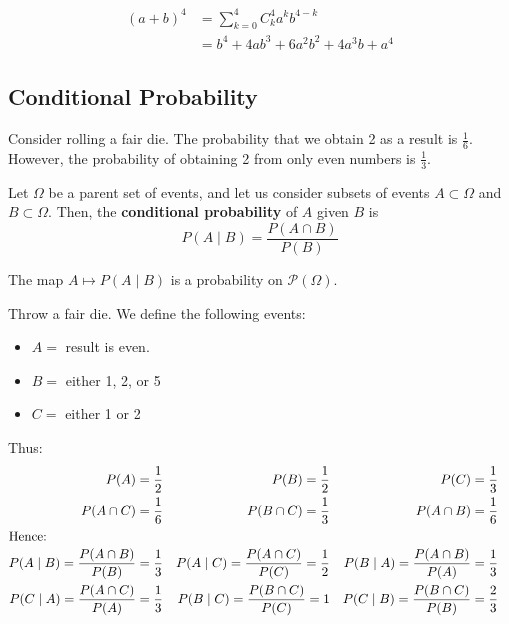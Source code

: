 \documentclass{article}
\begin{document}
	\begin{exmp}
		\begin{align*}
			(a+b)^4 &= \sum_{k=0}^4 C_k^4 a^k b^{4-k} \\
			&= b^4 + 4ab^3 + 6a^2 b^2 + 4a^3 b + a^4
		\end{align*}
	\end{exmp}
\hfill
\subsection{Conditional Probability}
	Consider rolling a fair die. The probability that we obtain 2 as a result is $\frac{1}{6}$. However, the probability of obtaining 2 from only even numbers is $\frac{1}{3}$.
	
	\begin{defn}
		Let $\Omega$ be a parent set of events, and let us consider subsets of events $A \subset \Omega$ and $B \subset \Omega$.  Then, the \textbf{conditional probability} of $A$ given $B$ is
		$$ P(A \mid B ) = \frac{P (A \cap B)}{P(B)}$$
	\end{defn}
	\begin{center}
	\end{center}
	\begin{rem}
		The map $A \mapsto P(A \mid B)$ is a probability on $\mathcal{P}(\Omega)$.
	\end{rem}
\pagebreak
	\begin{exmp}
		Throw a fair die. We define the following events:
		\begin{multicols}{3}
			\begin{itemize}
				\item $A= $ result is even.
				\item $B= $ either 1, 2, or 5
				\item $C= $ either 1 or 2
			\end{itemize}
		\end{multicols}
		Thus:
		\begin{align*}
		P(A)  = \frac12 && P(B) = \frac12 && P(C) = \frac13 &&  \\
		 P(A \cap C) = \frac16 && P(B \cap C) = \frac13 && P (A \cap B) = \frac16 && \\
		\intertext{Hence:}
		P(A \mid B) = \frac{P(A \cap B)}{P(B)} = \frac13 && P(A \mid C) = \frac{P(A \cap C)}{P(C)} = \frac12  &&P(B\mid A) = \frac{P(A \cap B)}{P(A)} = \frac13 && \\
		 P(C \mid A) = \frac{P(A \cap C)}{P(A)} = \frac13 && P(B \mid C) = \frac{P(B \cap C)}{P(C)} = 1 && P(C\mid B) = \frac{P(B \cap C)}{P(B)} = \frac23 &&
		\end{align*}
	\end{exmp}
\end{document}
